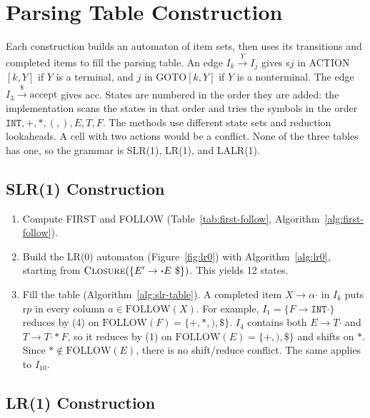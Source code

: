 \documentclass{article}
\newcommand{\tINT}{\mathtt{INT}}
\newcommand{\dt}{\mathbin{\boldsymbol{\cdot}}}
\newcommand{\Sp}{E'}
\begin{document}
\section{Parsing Table Construction}

Each construction builds an automaton of item sets, then uses its transitions and
completed items to fill the parsing table.
An edge $I_k \xrightarrow{Y} I_j$ gives s$j$ in ACTION$[k, Y]$ if $Y$ is a terminal,
and $j$ in GOTO$[k, Y]$ if $Y$ is a nonterminal.
The edge $I_3 \xrightarrow{\$} \text{accept}$ gives acc.
States are numbered in the order they are added: the implementation scans the states
in that order and tries the symbols in the order $\tINT, +, *, (, ), E, T, F$.
The methods use different state sets and reduction lookaheads.
A cell with two actions would be a conflict.
None of the three tables has one, so the grammar is SLR(1), LR(1), and LALR(1).

\subsection{SLR(1) Construction}

\begin{enumerate}[leftmargin=*]
  \item Compute FIRST and FOLLOW (Table~\ref{tab:first-follow}, Algorithm~\ref{alg:first-follow}).
  \item Build the LR(0) automaton (Figure~\ref{fig:lr0}) with Algorithm~\ref{alg:lr0},
    starting from $\textsc{Closure}(\{\Sp \to \dt E\ \$\})$.
    This yields 12 states.
  \item Fill the table (Algorithm~\ref{alg:slr-table}).
    A completed item $X \to \alpha\dt$ in $I_k$ puts r$p$ in every column
    $a \in \mathrm{FOLLOW}(X)$.
    For example, $I_1 = \{F \to \tINT\dt\}$ reduces by (4) on
    $\mathrm{FOLLOW}(F) = \{+, *, ), \$\}$.
    $I_4$ contains both $E \to T\dt$ and $T \to T\dt * F$, so it reduces by (1) on
    $\mathrm{FOLLOW}(E) = \{+, ), \$\}$ and shifts on $*$.
    Since $* \notin \mathrm{FOLLOW}(E)$, there is no shift/reduce conflict.
    The same applies to $I_{10}$.
\end{enumerate}

\subsection{LR(1) Construction}
\end{document}
